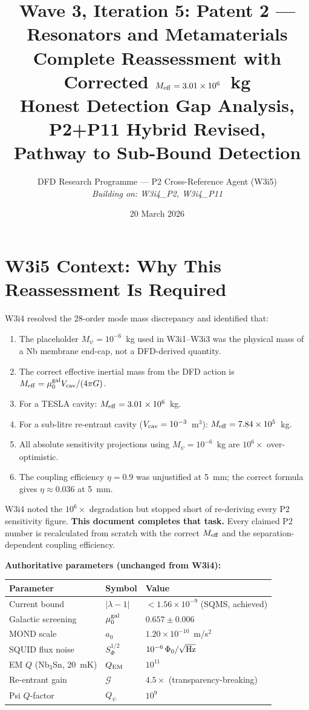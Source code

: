 \documentclass[11pt,twocolumn]{article}
\title{Wave 3, Iteration 5: Patent 2 --- Resonators and Metamaterials\\
\large Complete Reassessment with Corrected $\Meff = 3.01\ee{6}$~kg\\
Honest Detection Gap Analysis, P2+P11 Hybrid Revised,\\
Pathway to Sub-Bound Detection}
\author{DFD Research Programme --- P2 Cross-Reference Agent (W3i5)\\
\textit{Building on: W3i4\_P2, W3i4\_P11}}
\date{20 March 2026}
\newcommand{\lam}{\lambda}
\newcommand{\Mpsi}{M_\psi}
\newcommand{\Meff}{M_{\rm eff}}
\newcommand{\ee}[1]{\times 10^{#1}}
\newcommand{\Qpsi}{Q_\psi}
\newcommand{\Vcav}{V_{\rm cav}}
\newcommand{\muG}{\mu_0^{\rm gal}}
\theoremstyle{definition}
\theoremstyle{remark}
\begin{document}
\maketitle
\tableofcontents

\section{W3i5 Context: Why This Reassessment Is Required}
\label{sec:context}

W3i4 resolved the 28-order mode mass discrepancy and identified that:
\begin{enumerate}[nosep]
\item The placeholder $\Mpsi = 10^{-6}$~kg used in W3i1--W3i3 was the
  physical mass of a Nb membrane end-cap, not a DFD-derived quantity.
\item The correct effective inertial mass from the DFD action is
  $\Meff = \muG\Vcav/(4\pi G)$.
\item For a TESLA cavity: $\Meff = 3.01\ee{6}$~kg.
\item For a sub-litre re-entrant cavity ($\Vcav = 10^{-3}$~m$^3$):
  $\Meff = 7.84\ee{5}$~kg.
\item All absolute sensitivity projections using $\Mpsi = 10^{-6}$~kg
  are $10^6\times$ over-optimistic.
\item The coupling efficiency $\eta = 0.9$ was unjustified at 5~mm;
  the correct formula gives $\eta \approx 0.036$ at 5~mm.
\end{enumerate}

W3i4 noted the $10^6\times$ degradation but stopped short of
re-deriving every P2 sensitivity figure. \textbf{This document
completes that task.} Every claimed P2 number is recalculated from
scratch with the correct $\Meff$ and the separation-dependent
coupling efficiency.

\medskip
\noindent\textbf{Authoritative parameters (unchanged from W3i4):}
\begin{center}
\begin{tabular}{lll}
\toprule
Parameter & Symbol & Value \\
\midrule
Current bound & $|\lam-1|$ & $< 1.56\ee{-9}$ (SQMS, achieved) \\
Galactic screening & $\muG$ & $0.657 \pm 0.006$ \\
MOND scale & $a_0$ & $1.20\ee{-10}$~m/s$^2$ \\
SQUID flux noise & $S_\Phi^{1/2}$ & $10^{-6}\,\Phi_0/\sqrt{\rm Hz}$ \\
EM $Q$ (Nb$_3$Sn, 20~mK) & $Q_{\rm EM}$ & $10^{11}$ \\
Re-entrant gain & $\mathcal{G}$ & $4.5\times$ (transparency-breaking) \\
Psi $Q$-factor & $\Qpsi$ & $10^9$ \\
\bottomrule
\end{tabular}
\end{center}
\end{document}

